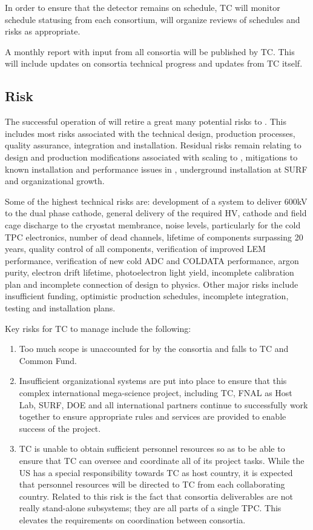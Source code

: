 In order to ensure that the  detector remains on schedule, TC
will monitor schedule statusing from each consortium, will organize
reviews of schedules and risks as appropriate.

A monthly report with input from all consortia will be published by
TC. This will include updates on consortia technical progress and
updates from TC itself.


\subsection{Risk}
\label{sec:fdsp-coord-risk}

The successful operation of  will retire a great many
potential risks to . This includes most risks associated with the
technical design, production processes, quality assurance, integration
and installation. Residual risks remain relating to design and
production modifications associated with scaling to , mitigations
to known installation and performance issues in , underground
installation at SURF and organizational growth.

Some of the highest technical risks are: development of a system to
deliver 600kV to the dual phase cathode, general delivery of the
required HV, cathode and field cage discharge to the cryostat
membrance, noise levels, particularly for the cold TPC electronics,
number of dead channels, lifetime of components surpassing 20 years,
quality control of all components, verification of improved LEM
performance, verification of new cold ADC and COLDATA performance,
argon purity, electron drift lifetime, photoelectron light yield,
incomplete calibration plan and incomplete connection of design to
physics. Other major risks include insufficient funding, optimistic
production schedules, incomplete integration, testing and installation
plans.

Key risks for TC to manage include the following:
\begin{enumerate}
    \item Too much scope is unaccounted for by the consortia and falls
      to TC and Common Fund.
    \item Insufficient organizational systems are put into place to
      ensure that this complex international mega-science project,
      including TC, FNAL as Host Lab, SURF, DOE and all international
      partners continue to successfully work together to ensure
      appropriate rules and services are provided to enable success of
      the project.
  \item TC is unable to obtain sufficient personnel resources so as to
    be able to ensure that TC can oversee and coordinate all of its
    project tasks.  While the US has a special responsibility towards
    TC as host country, it is expected that personnel resources will
    be directed to TC from each collaborating country. Related to this
    risk is the fact that consortia deliverables are not really
    stand-alone subsystems; they are all parts of a single TPC. This
    elevates the requirements on coordination between consortia.
\end{enumerate}

